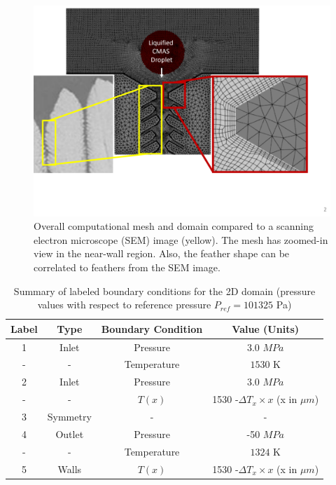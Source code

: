 \documentclass[%
 aip,
 amsmath,amssymb,
 reprint,%
]{revtex4-1}
\begin{document}

\begin{figure}[htp!]
\centering
\includegraphics[width=\linewidth]{Figures/mesh_and_sem_compare.png}
\caption{Overall computational mesh and domain compared to a scanning electron microscope (SEM) image (yellow). The mesh has zoomed-in view in the near-wall region. Also, the feather shape can be correlated to feathers from the SEM image.}
\label{fig:mesh}
\end{figure}



\begin{table}[htp!]
\caption{\label{tab:2DboundaryConditions} Summary of labeled boundary conditions for the 2D domain (pressure values with respect to reference pressure $P_{ref} = 101325$ Pa)}
\centering
\begin{ruledtabular}
\begin{tabular}{cccc}
Label &Type& Boundary Condition& Value (Units)\\\hline
1& Inlet&Pressure & 3.0 $MPa$\\
-& -&Temperature& $1530$ K\\
2& Inlet&Pressure& 3.0  $MPa$\\
-& -&$T(x)$& 1530 -$\Delta T_{x}\times x$ (x in $\mu m$)\\
3& Symmetry&- & -\\
4& Outlet&Pressure& -50 $MPa$\\
-& -&Temperature & $1324$ K \\
5& Walls&$T(x)$& 1530 -$\Delta T_{x}\times x$ (x in $\mu m$)\\
\end{tabular}
\end{ruledtabular}
\end{table}
\end{document}
